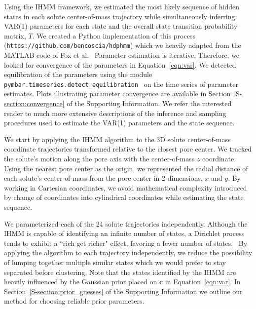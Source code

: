 \documentclass[journal=jpcbfk,manuscript=article]{achemso}
\begin{document}
  Using the IHMM framework, we estimated the most likely sequence of hidden states in
  each solute center-of-mass trajectory while simultaneously inferring VAR(1)
  parameters for each state and the overall state transition probability matrix, $T$.
  We created a Python implementation of this process 
  (\texttt{https://github.com/bencoscia/hdphmm}) which we heavily adapted from
  the MATLAB code of Fox et al.~\cite{fox_bayesian_2010} Parameter estimation is iterative. 
  Therefore, we looked for convergence of the parameters in Equation~\ref{eqn:var}.
  We detected equilibration of the parameters using the module \texttt{pymbar.timeseries.detect\_equilibration}~\cite{chodera_simple_2016} 
  on the time series of parameter estimates. Plots illustrating parameter convergence are 
  available in Section~\ref{S-section:convergence} of the Supporting Information. We 
  refer the interested reader to much more extensive descriptions of the inference and 
  sampling procedures used to estimate the VAR(1) parameters and the state sequence. ~\cite{beal_infinite_2002,teh_hierarchical_2006,van_gael_beam_2008,fox_nonparametric_2009,fox_bayesian_2010}
  
  We start by applying the IHMM algorithm to the 3D solute center-of-mass coordinate 
  trajectories transformed relative to the closest pore center. We tracked the solute's
  motion along the pore axis with the center-of-mass $z$ coordinate. Using the nearest
  pore center as the origin, we represented the radial distance of each solute's 
  center-of-mass from the pore center in 2 dimensions, $x$ and $y$. By working in 
  Cartesian coordinates, we avoid mathematical complexity introduced by change of 
  coordinates into cylindrical coordinates while estimating the state sequence.

  We parameterized each of the 24 solute trajectories independently.
  Although the IHMM is capable of identifying an infinite number of states, 
  a Dirichlet process tends to exhibit a ``rich get richer" effect, favoring
  a fewer number of states.~\cite{dreyer_discovering_2011} By applying the algorithm to each trajectory 
  independently, we reduce the possibility of lumping together multiple 
  similar states which we would prefer to stay separated before clustering.
  Note that the states identified by the IHMM are heavily influenced by 
  the Gaussian prior placed on $\mathbf{c}$ in Equation~\ref{eqn:var}. 
  In Section~\ref{S-section:prior_guesses} of the Supporting Information we 
  outline our method for choosing reliable prior parameters. 
\end{document}
